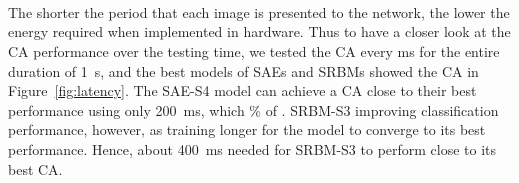 \DIFaddbegin \paragraph{\\}

\DIFaddend The shorter the period that each image is presented to the network, the lower the energy required when implemented in hardware.
Thus to have a closer look at the CA performance over the testing time, we tested the CA \DIFdelbegin {}\DIFdelend \DIFaddbegin {}\DIFaddend every ms for the entire duration of 1~s, and the best models of SAEs and SRBMs showed the CA in Figure~\ref{fig:latency}.
The SAE-S4 model can achieve a CA close to their best performance using only 200~ms, which \DIFdelbegin {}\DIFdelend \DIFaddbegin {}\% of \DIFdelbegin {}\DIFdelend \DIFaddbegin {}\DIFaddend .
SRBM-S3 \DIFdelbegin {}\DIFdelend \DIFaddbegin {}\DIFaddend improving classification performance, however, as training \DIFdelbegin {}\DIFdelend \DIFaddbegin {}\DIFaddend longer for the model to converge to its best performance.
Hence, about 400~ms \DIFdelbegin {}\DIFdelend \DIFaddbegin {}\DIFaddend needed for SRBM-S3 to perform close to its best CA.

\DIFaddbegin \paragraph{\\}

